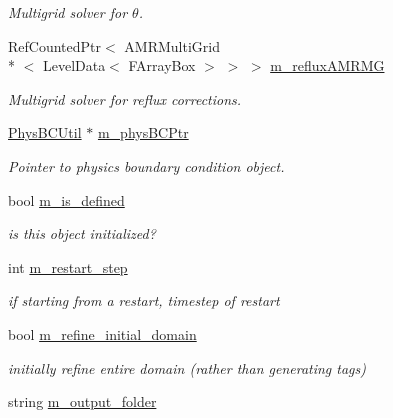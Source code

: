 \begin{DoxyCompactItemize}
\begin{DoxyCompactList}\small\item\em Multigrid solver for $ \theta $. \end{DoxyCompactList}\item 
\hypertarget{classamr_mushy_layer_a372db2a37684c61ed39145954cb623dc}{Ref\-Counted\-Ptr$<$ A\-M\-R\-Multi\-Grid\\*
$<$ Level\-Data$<$ F\-Array\-Box $>$ $>$ $>$ \hyperlink{classamr_mushy_layer_a372db2a37684c61ed39145954cb623dc}{m\-\_\-reflux\-A\-M\-R\-M\-G}}\label{classamr_mushy_layer_a372db2a37684c61ed39145954cb623dc}

\begin{DoxyCompactList}\small\item\em Multigrid solver for reflux corrections. \end{DoxyCompactList}\item 
\hypertarget{classamr_mushy_layer_a451d9fac98dc5d672b8a5ba93b6e8d0d}{\hyperlink{class_phys_b_c_util}{Phys\-B\-C\-Util} $\ast$ \hyperlink{classamr_mushy_layer_a451d9fac98dc5d672b8a5ba93b6e8d0d}{m\-\_\-phys\-B\-C\-Ptr}}\label{classamr_mushy_layer_a451d9fac98dc5d672b8a5ba93b6e8d0d}

\begin{DoxyCompactList}\small\item\em Pointer to physics boundary condition object. \end{DoxyCompactList}\item 
\hypertarget{classamr_mushy_layer_a42144967628e2cb15758a5b119c16b38}{bool \hyperlink{classamr_mushy_layer_a42144967628e2cb15758a5b119c16b38}{m\-\_\-is\-\_\-defined}}\label{classamr_mushy_layer_a42144967628e2cb15758a5b119c16b38}

\begin{DoxyCompactList}\small\item\em is this object initialized? \end{DoxyCompactList}\item 
\hypertarget{classamr_mushy_layer_aa868e891b991b1730f44847912b1d778}{int \hyperlink{classamr_mushy_layer_aa868e891b991b1730f44847912b1d778}{m\-\_\-restart\-\_\-step}}\label{classamr_mushy_layer_aa868e891b991b1730f44847912b1d778}

\begin{DoxyCompactList}\small\item\em if starting from a restart, timestep of restart \end{DoxyCompactList}\item 
bool \hyperlink{classamr_mushy_layer_a9a6dfcb69360b920e0eb7d995ed4c144}{m\-\_\-refine\-\_\-initial\-\_\-domain}
\begin{DoxyCompactList}\small\item\em initially refine entire domain (rather than generating tags) \end{DoxyCompactList}\item 
\hypertarget{classamr_mushy_layer_aac76e5d9044ef2b9f8c108c6611de9b4}{string \hyperlink{classamr_mushy_layer_aac76e5d9044ef2b9f8c108c6611de9b4}{m\-\_\-output\-\_\-folder}}\label{classamr_mushy_layer_aac76e5d9044ef2b9f8c108c6611de9b4}


\end{DoxyCompactItemize}
